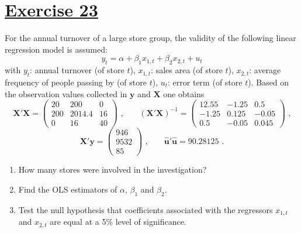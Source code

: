 \documentclass[captions=tableheading, 12pt, headings=small, parskip=half]{scrartcl}
\begin{document}
\section*{\underline{Exercise 23}}
For the annual turnover of a large store group, the validity of the following linear regression model is assumed:
\[
y_t = \alpha + \beta_1x_{1,t} + \beta_2x_{2,t} + u_t
\]with $y_t$: annual turnover (of store $t$), $x_{1,t}$: sales area (of store $t$), $x_{2,t}$: average frequency of people passing by (of store $t$), $u_t$: error term (of store $t$). Based on the observation values collected in $\boldsymbol{y}$ and $\boldsymbol{X}$ one obtains
\[
\boldsymbol{X}'\boldsymbol{X} =
\begin{pmatrix}
20 & 200 & 0 \\
200 & 2014.4 & 16 \\
0 & 16 & 40
\end{pmatrix} \text{ ,}\qquad
(\boldsymbol{X}'\boldsymbol{X})^{-1} = 
\begin{pmatrix}
12.55 & -1.25 & 0.5 \\
-1.25 & 0.125 & -0.05 \\
0.5 & -0.05 & 0.045
\end{pmatrix}\text{ ,}
\]
\[
\boldsymbol{X}'\boldsymbol{y} = \begin{pmatrix} 946\\9532\\85 \end{pmatrix}\text{ ,} \qquad
\boldsymbol{\hat{u}}'\boldsymbol{\hat{u}} = 90.28125\text{ .}
\]
\begin{enumerate}[label = \alph*)]
	\item How many stores were involved in the investigation?
	\item Find the OLS estimators of $\alpha$, $\beta_1$ and $\beta_2$.
	\item Test the null hypothesis that coefficients associated with the regressors $x_{1,t}$ and $x_{2,t}$ are equal at a 5\% level of significance.
\end{enumerate}
\end{document}
